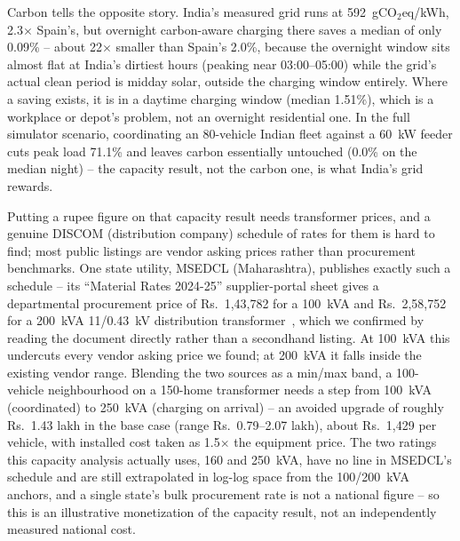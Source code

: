 \documentclass[journal]{IEEEtran}
\begin{document}
Carbon tells the opposite story. India's measured grid runs at 592~gCO$_2$eq/kWh, 2.3$\times$ Spain's, but overnight carbon-aware charging there saves a median of only 0.09\% -- about 22$\times$ smaller than Spain's 2.0\%, because the overnight window sits almost flat at India's dirtiest hours (peaking near 03:00--05:00) while the grid's actual clean period is midday solar, outside the charging window entirely. Where a saving exists, it is in a daytime charging window (median 1.51\%), which is a workplace or depot's problem, not an overnight residential one. In the full simulator scenario, coordinating an 80-vehicle Indian fleet against a 60~kW feeder cuts peak load 71.1\% and leaves carbon essentially untouched (0.0\% on the median night) -- the capacity result, not the carbon one, is what India's grid rewards.

Putting a rupee figure on that capacity result needs transformer prices, and a genuine DISCOM (distribution company) schedule of rates for them is hard to find; most public listings are vendor asking prices rather than procurement benchmarks. One state utility, MSEDCL (Maharashtra), publishes exactly such a schedule -- its ``Material Rates 2024-25'' supplier-portal sheet gives a departmental procurement price of Rs.~1,43,782 for a 100~kVA and Rs.~2,58,752 for a 200~kVA 11/0.43~kV distribution transformer~\cite{msedcl2024}, which we confirmed by reading the document directly rather than a secondhand listing. At 100~kVA this undercuts every vendor asking price we found; at 200~kVA it falls inside the existing vendor range. Blending the two sources as a min/max band, a 100-vehicle neighbourhood on a 150-home transformer needs a step from 100~kVA (coordinated) to 250~kVA (charging on arrival) -- an avoided upgrade of roughly Rs.~1.43 lakh in the base case (range Rs.~0.79--2.07 lakh), about Rs.~1,429 per vehicle, with installed cost taken as 1.5$\times$ the equipment price. The two ratings this capacity analysis actually uses, 160 and 250~kVA, have no line in MSEDCL's schedule and are still extrapolated in log-log space from the 100/200~kVA anchors, and a single state's bulk procurement rate is not a national figure -- so this is an illustrative monetization of the capacity result, not an independently measured national cost.
\end{document}
